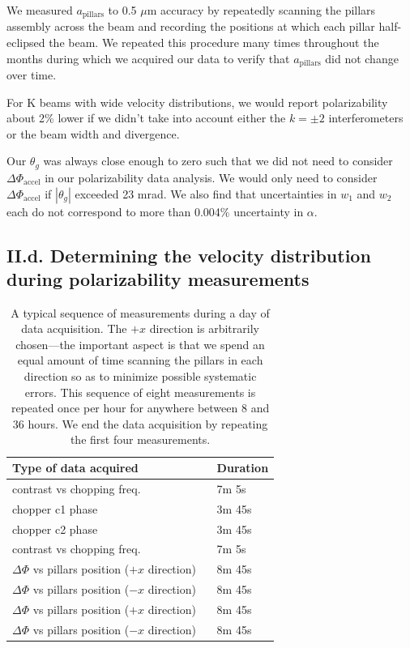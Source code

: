 \documentclass[twocolumn,prl,showpacs,superscriptaddress,longbibliography]{revtex4-1}   %
\newcommand{\sspace}{$\enspace$}
\newcommand{\dphiaccel}{\Delta\Phi_{\mathrm{accel}}}
\begin{document}
We measured $a_{\mathrm{pillars}}$ to 0.5 $\mu$m accuracy by repeatedly scanning the pillars assembly across the beam and recording the positions at which each pillar half-eclipsed the beam. 
We repeated this procedure many times throughout the months during which we acquired our data to verify that $a_{\mathrm{pillars}}$ did not change over time. 

For K beams with wide velocity distributions, we would report polarizability about 2\% lower if we didn't take into account either the $k=\pm 2$ interferometers or the beam width and divergence.

Our $\theta_g$ was always close enough to zero such that we did not need to consider $\dphiaccel$ in our polarizability data analysis. We would only need to consider $\dphiaccel$ if $|\theta_g|$ exceeded 23 mrad.
We also find that uncertainties in $w_1$ and $w_2$ each do not correspond to more than 0.004\% uncertainty in $\alpha$.

\subsection{II.d. Determining the velocity distribution during polarizability measurements}

\begingroup
\begin{table}
\caption{\label{schedule}A typical sequence of measurements during a day of data acquisition. The $+x$ direction is arbitrarily chosen---the important aspect is that we spend an equal amount of time scanning the pillars in each direction so as to minimize possible systematic errors. This sequence of eight measurements is repeated once per hour for anywhere between 8 and 36 hours. We end the data acquisition by repeating the first four measurements.}
\begin{center}
\begin{tabular}{l l}
\hline
\hline
Type of data acquired & Duration \\
\hline
contrast vs chopping freq. & 7m 5s \\
chopper c1 phase & 3m 45s \\
chopper c2 phase & 3m 45s\\
contrast vs chopping freq. & 7m 5s \\
$\Delta\Phi$ vs pillars position ($+x$ direction) \sspace & 8m 45s \\
$\Delta\Phi$ vs pillars position ($-x$ direction) & 8m 45s \\
$\Delta\Phi$ vs pillars position ($+x$ direction) & 8m 45s \\
$\Delta\Phi$ vs pillars position ($-x$ direction) & 8m 45s \\
\hline
\hline
\end{tabular}
\end{center}
\end{table}
\endgroup
\end{document}
